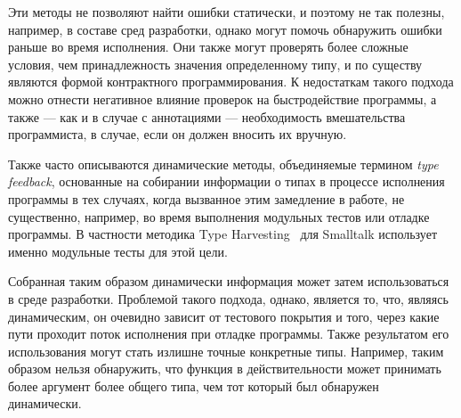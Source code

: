 Эти методы не позволяют найти ошибки статически, и поэтому не так полезны,
например, в составе сред разработки, однако могут помочь обнаружить ошибки
раньше во время исполнения.  Они также могут проверять более сложные условия,
чем принадлежность значения определенному типу, и по существу являются формой
контрактного программирования.  К недостаткам такого подхода можно отнести
негативное влияние проверок на быстродействие программы, а также --- как и
в случае с аннотациями --- необходимость вмешательства программиста, в случае,
если он должен вносить их вручную.

Также часто описываются динамические методы, объединяемые термином \emph{type
  feedback}, основанные на собирании информации о типах в процессе исполнения
программы в тех случаях, когда вызванное этим замедление в работе, не
существенно, например, во время выполнения модульных тестов или отладке
программы. В частности методика Type Harvesting~\cite{Haupt2011}
для Smalltalk использует именно модульные тесты для этой цели.

Собранная таким образом динамически информация может затем использоваться в
среде разработки.  Проблемой такого подхода, однако, является то, что, являясь
динамическим, он очевидно зависит от тестового покрытия и того, через какие пути
проходит поток исполнения при отладке программы. Также результатом его
использования могут стать излишне точные конкретные типы. Например, таким
образом нельзя обнаружить, что функция в действительности может принимать более
аргумент более общего типа, чем тот который был обнаружен динамически.
